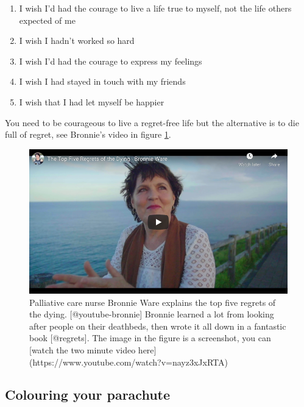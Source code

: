 \documentclass[
]{book}
\providecommand{\tightlist}{%
  \setlength{\itemsep}{0pt}\setlength{\parskip}{0pt}}
\begin{document}
\begin{enumerate}
\def\labelenumi{\arabic{enumi}.}
\tightlist
\item
  I wish I'd had the courage to live a life true to myself, not the life others expected of me
\item
  I wish I hadn't worked so hard
\item
  I wish I'd had the courage to express my feelings
\item
  I wish I had stayed in touch with my friends
\item
  I wish that I had let myself be happier
\end{enumerate}

You need to be courageous to live a regret-free life but the alternative is to die full of regret, see Bronnie's video in figure \ref{fig:bronnie-fig}.

\begin{figure}

{\centering \includegraphics[width=0.99\linewidth]{images/youtube-bronnie} 

}

\caption{Palliative care nurse Bronnie Ware explains the top five regrets of the dying. [@youtube-bronnie] Bronnie learned a lot from looking after people on their deathbeds, then wrote it all down in a fantastic book [@regrets]. The image in the figure is a screenshot, you can [watch the two minute video here](https://www.youtube.com/watch?v=nayz3xJxRTA) }\label{fig:bronnie-fig}
\end{figure}

\hypertarget{parachute}{%
\subsection{Colouring your parachute}\label{parachute}}
\end{document}
